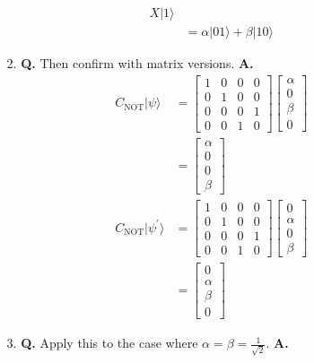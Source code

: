 \documentclass[main.tex]{subfiles}
\begin{document}
\begin{enumerate}
\begin{enumerate}
\begin{align*}
                                                X|1\rangle\\
                                                & = \alpha|01\rangle + \beta|10\rangle
        \end{align*}
        \item[2.] \textbf{Q.} Then confirm with matrix versions. \textbf{A.}
        \begin{align*}
            C_{\text{NOT}}|\psi\rangle          & = \left[\begin{array}{llll}1&0&0&0\\0&1&0&0\\0&0&0&1\\0&0&1&0\end{array}\right]
                                                \left[\begin{array}{l}\alpha\\0\\\beta\\0\end{array}\right]\\
                                                & = \left[\begin{array}{l}\alpha\\0\\0\\\beta\end{array}\right]\\
            C_{\text{NOT}}|\psi^{\prime}\rangle & = \left[\begin{array}{llll}1&0&0&0\\0&1&0&0\\0&0&0&1\\0&0&1&0\end{array}\right]
                                                \left[\begin{array}{l}0\\\alpha\\0\\\beta\end{array}\right]\\
                                                & = \left[\begin{array}{l}0\\\alpha\\\beta\\0\end{array}\right]
        \end{align*}
        \item[3.] \textbf{Q.} Apply this to the case where $\alpha=\beta=\frac{1}{\sqrt{2}}$. \textbf{A.}

\end{enumerate}
\end{enumerate}
\end{document}

